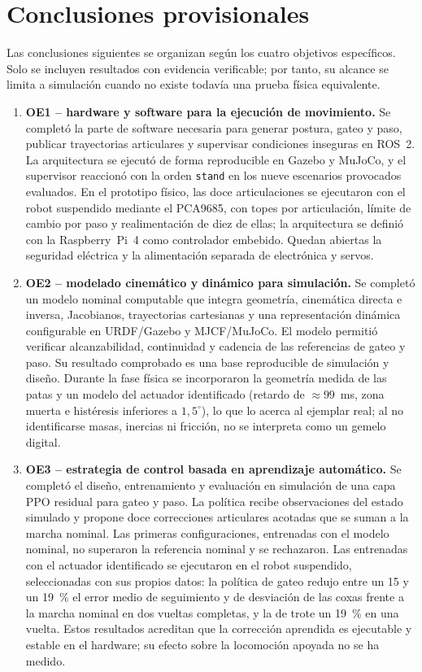 \chapter{Conclusiones provisionales}

Las conclusiones siguientes se organizan según los cuatro objetivos
específicos. Solo se incluyen resultados con evidencia verificable; por tanto,
su alcance se limita a simulación cuando no existe todavía una prueba física
equivalente.

\begin{enumerate}
\item \textbf{OE1 -- hardware y software para la ejecución de movimiento.}
Se completó la parte de software necesaria para generar postura, gateo y paso,
publicar trayectorias articulares y supervisar condiciones inseguras en ROS~2.
La arquitectura se ejecutó de forma reproducible en Gazebo y MuJoCo, y el
supervisor reaccionó con la orden \texttt{stand} en los nueve escenarios
provocados evaluados. En el prototipo físico, las doce articulaciones se ejecutaron con
el robot suspendido mediante el PCA9685, con topes por articulación, límite de
cambio por paso y realimentación de diez de ellas; la arquitectura se definió
con la Raspberry~Pi~4 como controlador embebido. Quedan abiertas la seguridad
eléctrica y la alimentación separada de electrónica y servos.

\item \textbf{OE2 -- modelado cinemático y dinámico para simulación.}
Se completó un modelo nominal computable que integra geometría, cinemática
directa e inversa, Jacobianos, trayectorias cartesianas y una representación
dinámica configurable en URDF/Gazebo y MJCF/MuJoCo. El modelo permitió verificar
alcanzabilidad, continuidad y cadencia de las referencias de gateo y paso. Su
resultado comprobado es una base reproducible de simulación y diseño. Durante la
fase física se incorporaron la geometría medida de las patas y un modelo del
actuador identificado (retardo de $\approx99$~ms, zona muerta e histéresis
inferiores a $1{,}5^\circ$), lo que lo acerca al ejemplar real; al no
identificarse masas, inercias ni fricción, no se interpreta como un gemelo
digital.

\item \textbf{OE3 -- estrategia de control basada en aprendizaje automático.}
Se completó el diseño, entrenamiento y evaluación en simulación de una capa PPO
residual para gateo y paso. La política recibe observaciones del estado
simulado y propone doce correcciones articulares acotadas que se suman a la
marcha nominal. Las primeras configuraciones, entrenadas con el modelo nominal,
no superaron la referencia nominal y se rechazaron. Las entrenadas con el
actuador identificado se ejecutaron en el robot suspendido, seleccionadas con
sus propios datos: la política de gateo redujo entre un 15 y un 19~\% el error
medio de seguimiento y de desviación de las coxas frente a la marcha nominal en
dos vueltas completas, y la de trote un 19~\% en una vuelta. Estos resultados
acreditan que la corrección aprendida es ejecutable y estable en el hardware;
su efecto sobre la locomoción apoyada no se ha medido.


\end{enumerate}
